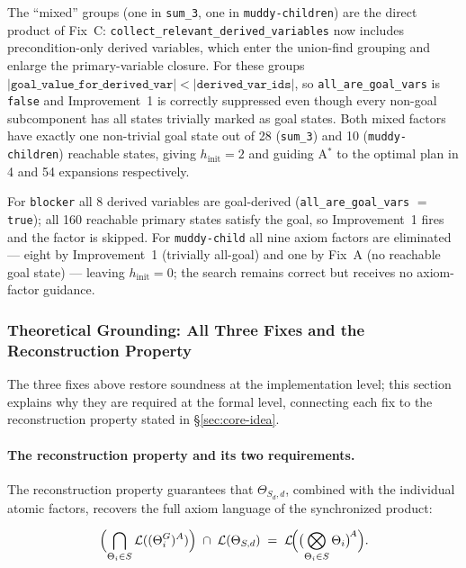 \documentclass[11pt,a4paper]{article}
\begin{document}
The ``mixed'' groups (one in \texttt{sum\_3}, one in
\texttt{muddy-children}) are the direct product of Fix~C:
\texttt{collect\_relevant\_derived\_variables} now includes
precondition-only derived variables, which enter the union-find grouping and
enlarge the primary-variable closure.
For these groups
$|\texttt{goal\_value\_for\_derived\_var}| < |\texttt{derived\_var\_ids}|$,
so \texttt{all\_are\_goal\_vars} is \texttt{false} and Improvement~1 is
correctly suppressed even though every non-goal subcomponent has all states
trivially marked as goal states.
Both mixed factors have exactly one non-trivial goal state out of 28
(\texttt{sum\_3}) and 10 (\texttt{muddy-children}) reachable states,
giving $h_{\text{init}}=2$ and guiding A$^*$ to the optimal plan in
4 and 54 expansions respectively.

For \texttt{blocker} all 8 derived variables are goal-derived
(\texttt{all\_are\_goal\_vars} $=$ \texttt{true}); all 160 reachable
primary states satisfy the goal, so Improvement~1 fires and the factor is
skipped.
For \texttt{muddy-child} all nine axiom factors are eliminated ---
eight by Improvement~1 (trivially all-goal) and one by Fix~A (no
reachable goal state) --- leaving $h_{\text{init}}=0$; the search remains
correct but receives no axiom-factor guidance.

\subsubsection{Theoretical Grounding: All Three Fixes and the Reconstruction
Property}
\label{sec:when-clause-theory}

The three fixes above restore soundness at the implementation level; this
section explains why they are required at the formal level, connecting each
fix to the reconstruction property stated in \S\ref{sec:core-idea}.

\paragraph{The reconstruction property and its two requirements.}

The reconstruction property guarantees that $\Theta_{S_d,d}$, combined
with the individual atomic factors, recovers the full axiom language of
the synchronized product:

\[
  \Bigl(\bigcap_{\Theta_i \in S} \mathcal{L}((\Theta_i^G)^A)\Bigr)
  \;\cap\;
  \mathcal{L}(\Theta_{S,d})
  \;=\;
  \mathcal{L}\!\Bigl(\bigl(\bigotimes_{\Theta_i \in S} \Theta_i\bigr)^{\!A}\Bigr).
\]
\end{document}
